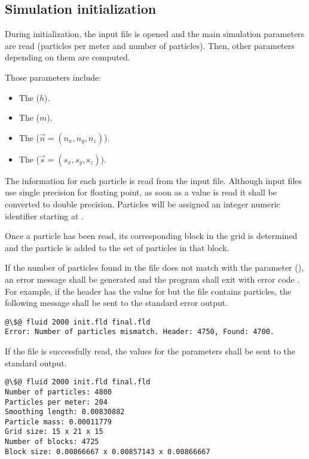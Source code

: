 \subsection{Simulation initialization}

During initialization, the input file is opened and the main simulation
parameters are read (particles per meter and number of particles).
Then, other parameters depending on them are computed.

Those parameters include:
\begin{itemize}
\item The  ($h$).
\item The  ($m$).
\item The  ($\vec{n} = (n_x, n_y, n_z)$).
\item The  ($\vec{s} = (s_x, s_y, s_z)$).
\end{itemize}

The information for each particle is read from the input file. Although input
files use single precision for floating point, as soon as a value is read it
shall be converted to double precision.  Particles will be assigned an integer
numeric identifier starting at .

Once a particle has been read, its corresponding block in the grid is determined
and the particle is added to the set of particles in that block. 

If the number of particles found in the file does not match with the parameter
 (), an error message shall be generated
and the program shall exit with error code . For example, if the 
header has the value  for  but the file contains 
 particles, the following message shall be sent to the standard
error output.

\begin{lstlisting}[style=terminal,escapechar=@]
@\$@ fluid 2000 init.fld final.fld
Error: Number of particles mismatch. Header: 4750, Found: 4700.
\end{lstlisting}

If the file is successfully read, the values for the parameters shall be sent
to the standard output.

\begin{lstlisting}[style=terminal,escapechar=@]
@\$@ fluid 2000 init.fld final.fld
Number of particles: 4800
Particles per meter: 204
Smoothing length: 0.00830882
Particle mass: 0.00011779
Grid size: 15 x 21 x 15
Number of blocks: 4725
Block size: 0.00866667 x 0.00857143 x 0.00866667
\end{lstlisting}

